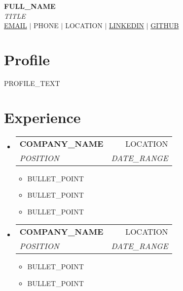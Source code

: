 \documentclass[letterpaper,10pt]{article}
\makeatletter
\newcommand{\resumeItem}[1]{
  \item\small{#1}
}
\newcommand{\resumeSubheading}[4]{
  \vspace{1pt}
  \item
    \begin{tabular*}{0.97\textwidth}[t]{l@{\extracolsep{\fill}}r}
      \textbf{#1} & #2 \\
      \textit{#3} & \textit{#4} \\
    \end{tabular*}\vspace{1pt}
}
\makeatother
\begin{document}

\begin{center}
\vspace{-0.8in}
{\Large\color{white}\textbf{{FULL\_NAME}}}\\
\vspace{0.05in}
{\small\color{white}\textit{{TITLE}}}\\
\vspace{0.1in}
\color{white}\small
{} \href{mailto:{EMAIL}}{{EMAIL}} $|$ 
 {PHONE} $|$ 
 {LOCATION} $|$ 
 \href{https://linkedin.com/in/{LINKEDIN}}{{LINKEDIN}} $|$ 
 \href{https://github.com/{GITHUB}}{{GITHUB}}
\end{center}

\vspace{0.2in}

\section{Profile}
{\small {PROFILE\_TEXT}}

\section{Experience}
\begin{itemize}[leftmargin=0.15in, label={}]
    \resumeSubheading
      {COMPANY\_NAME}{LOCATION}
      {POSITION}{DATE\_RANGE}
      \begin{itemize}[leftmargin=0.15in, label=\textbullet]
        \resumeItem{BULLET\_POINT}
        \resumeItem{BULLET\_POINT}
        \resumeItem{BULLET\_POINT}
      \end{itemize}
    
    \resumeSubheading
      {COMPANY\_NAME}{LOCATION}
      {POSITION}{DATE\_RANGE}
      \begin{itemize}[leftmargin=0.15in, label=\textbullet]
        \resumeItem{BULLET\_POINT}
        \resumeItem{BULLET\_POINT}
      \end{itemize}
\end{itemize}
\end{document}
